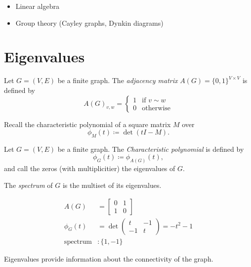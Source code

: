 \begin{itemize}
\item Linear algebra
\item Group theory (Cayley graphs, Dynkin diagrams)
\end{itemize}

\section{Eigenvalues}

\begin{definition}
Let \(G=(V,E)\) be a finite graph.
The \emph{adjacency matrix} \( A(G)=\{0,1\}^{V\times V} \) is defined by
\[ A(G)_{v,w}=\begin{cases} 1 & \text{if } v\sim w \\ 0 & \text{otherwise} \end{cases} \]
\end{definition}

Recall the characteristic polynomial of a square matrix \(M\) over \C
\[ \phi_M(t)\coloneqq \det(tI-M). \]


\begin{definition}
Let \(G=(V,E)\) be a finite graph.
The \emph{Characteristic polynomial} is defined by
\[ \phi_G(t)\coloneqq \phi_{A(G)}(t), \]
and call the zeros (with multiplicitier) the eigenvalues of \(G\).
\end{definition}

\begin{definition}[Spectrum]
The \emph{spectrum} of \(G\) is the multiset of its eigenvalues.
\end{definition}

\begin{example}[spectrum]
\begin{align*}
A(G)&=\begin{bmatrix} 0 & 1 \\ 1 & 0 \end{bmatrix}\\
\phi_G(t)&=\det\begin{pmatrix} t & -1 \\ -1 & t \end{pmatrix}=-t^2-1\\
\text{spectrum}&: \{1,-1\}
\end{align*}
\end{example}

\begin{remark}
Eigenvalues provide information about the connectivity of the graph.
\end{remark}


